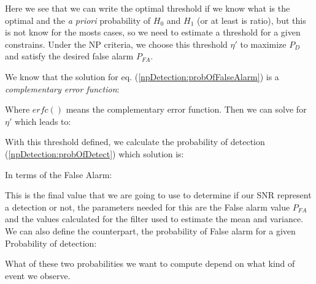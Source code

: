 
\newp Here we see that we can write the optimal threshold if we know what is the optimal and the \textit{a priori} probability of $H_0$ and $H_1$ (or at least is ratio), but this is not know for the mosts cases, so we need to estimate a threshold for a given constrains. Under the NP criteria, we choose this threshold $\eta'$ to maximize $P_D$ and satisfy the desired false alarm $P_{FA}$.

\newp We know that the solution for eq. (\ref{npDetection:probOfFalseAlarm}) is a \textit{complementary error function}:

\newp Where $erfc()$ means the complementary error function. Then we can solve for $\eta'$ which leads to:


\newp With this threshold defined, we calculate the probability of detection (\ref{npDetection:probOfDetect}) which solution is:


\newp In terms of the False Alarm:


\newp This is the final value that we are going to use to determine if our SNR represent a detection or not, the parameters needed for this are the False alarm value $P_{FA}$ and the values calculated for the filter used to estimate the mean and variance. We can also define the counterpart, the probability of False alarm for a given Probability of detection:


\newp What of these two probabilities we want to compute depend on what kind of event we observe.




\newpage
\nocite{*}
%
%
\begin{multicols}{2}[\printbibheading]
\printbibliography[heading=none]
\end{multicols}
